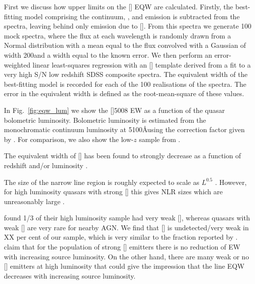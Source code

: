 First we discuss how upper limits on the [] \ac{EQW} are calculated.
Firstly, the best-fitting model comprising the continuum, , and \hb emission is subtracted from the spectra, leaving behind only emission due to []. 
From this spectra we generate 100 mock spectra, where the flux at each wavelength is randomly drawn from a Normal distribution with a mean equal to the flux convolved with a Gaussian of width 200\kms and a width equal to the known error. 
We then perform an error-weighted linear least-squares regression with an [] template derived from a fit to a very high \ac{S/N} low redshift \ac{SDSS} composite spectra. 
The equivalent width of the best-fitting model is recorded for each of the 100 realisations of the spectra. 
The error in the equivalent width is defined as the root-mean-square of these values.

In Fig.~\ref{fig:eqw_lum} we show the []5008 EW as a function of the quasar bolometric luminosity. 
Bolometric luminosity is estimated from the monochromatic continuum luminosity at 5100\AA using the correction factor given by \citet{richards06}. 
For comparison, we also show the low-$z$ sample from \citet{shen11}.  

The equivalent width of [] has been found to strongly decrease as a function of redshift and/or luminosity \citep[e.g.][]{brotherton96,netzer04,sulentic04,baskin05b}. 

The size of the narrow line region is roughly expected to scale as $L^{0.5}$ \citep[e.g.][]{netzer04}. 
However, for high luminosity quasars with strong [] this gives \ac{NLR} sizes which are unreasonably large \citep[$\sim$100 kpc;][]{netzer04}. 

\citet{netzer04} found 1/3 of their high luminosity sample had very weak [], whereas quasars with weak [] are very rare for nearby \ac{AGN}. 
We find that [] is undetected/very weak in XX per cent of our sample, which is very similar to the fraction reported by \citet{netzer04}.  
\citet{netzer04} claim that for the population of strong [] emitters there is no reduction of EW with increasing source luminosity. 
On the other hand, there are many weak or no [] emitters at high luminosity that could give the impression that the line \ac{EQW} decreases with increasing source luminosity. 



